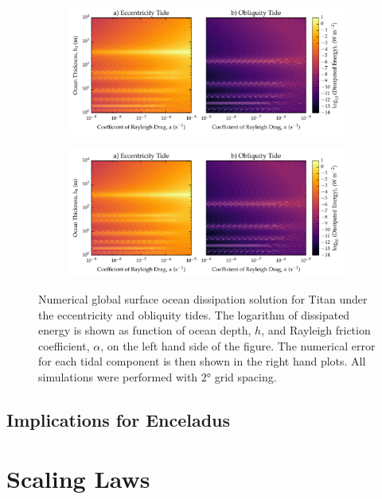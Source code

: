 \begin{figure}[!t]
    \centering
    \begin{subfigure}[t]{0.9\linewidth} %
        \includegraphics[width=\linewidth]{Figures/enceladus_linear}
        \label{fig:lincEccEncel}
    \end{subfigure}
    \begin{subfigure}[t]{0\linewidth} %
         \includegraphics[width=\linewidth]{Figures/enceladus_linear}
         \label{fig:linObliqEncel} 
    \end{subfigure}
    \vspace{-0.5cm}
\caption{Numerical global surface ocean dissipation solution for Titan under the eccentricity and obliquity tides. The logarithm of dissipated energy is shown as function of ocean depth, $h$, and Rayleigh friction coefficient, $\alpha$, on the left hand side of the figure. The numerical error for each tidal component is then shown in the right hand plots. All simulations were performed with $\ang{2}$ grid spacing. \label{fig:linEncel}}
\end{figure}

\subsection{Implications for Enceladus}

\section{Scaling Laws \label{subsec:scaling}}